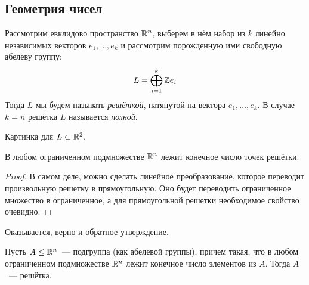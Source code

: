
\subsection{Геометрия чисел}

	Рассмотрим евклидово пространство $\mathbb{R}^n$, выберем в нём набор из $k$ линейно независимых векторов $e_1, \ldots, e_k$ и рассмотрим порожденную ими свободную абелеву группу:
	\[ 
		L = \bigoplus_{i = 1}^{k} \mathbb{Z} e_i 
	\]
	Тогда $L$ мы будем называть \emph{решёткой}, натянутой на вектора $e_1, \ldots, e_k$. В случае $k = n$ решётка $L$ называется \emph{полной}. 

	\begin{example}
		Картинка для $L \subset \mathbb{R}^2$.
	\end{example}

	\begin{statement} 
		В любом ограниченном подмножестве $\mathbb{R}^n$ лежит конечное число точек решётки. 
	\end{statement}

	\begin{proof}
		В самом деле, можно сделать линейное преобразование, которое переводит произвольную решетку в прямоугольную. Оно будет переводить ограниченное множество в ограниченное, а для прямоугольной решетки необходимое свойство очевидно. 
	\end{proof}

	Оказывается, верно и обратное утверждение. 

	\begin{statement} 
		Пусть $A \le \mathbb{R}^n$~--- подгруппа (как абелевой группы), причем такая, что в любом ограниченном подмножестве $\mathbb{R}^n$ лежит конечное число элементов из $A$. Тогда $A$~--- решётка. 
	\end{statement}

